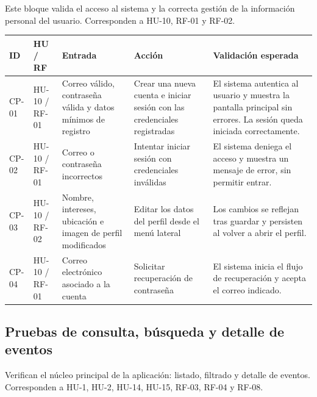 Este bloque valida el acceso al sistema y la correcta gestión de la información personal del usuario. Corresponden a HU-10, RF-01 y RF-02.

\begin{longtable}{|p{1.3cm}|p{1.6cm}|p{3cm}|p{3.8cm}|p{4.3cm}|}
\hline
\textbf{ID} & \textbf{HU / RF} & \textbf{Entrada} & \textbf{Acción} & \textbf{Validación esperada} \\
\hline
{}\label{cp:01}CP-01 & HU-10 / RF-01 & Correo válido, contraseña válida y datos mínimos de registro & Crear una nueva cuenta e iniciar sesión con las credenciales registradas & El sistema autentica al usuario y muestra la pantalla principal sin errores. La sesión queda iniciada correctamente. \\
\hline
{}\label{cp:02}CP-02 & HU-10 / RF-01 & Correo o contraseña incorrectos & Intentar iniciar sesión con credenciales inválidas & El sistema deniega el acceso y muestra un mensaje de error, sin permitir entrar. \\
\hline
{}\label{cp:03}CP-03 & HU-10 / RF-02 & Nombre, intereses, ubicación e imagen de perfil modificados & Editar los datos del perfil desde el menú lateral & Los cambios se reflejan tras guardar y persisten al volver a abrir el perfil. \\
\hline
{}\label{cp:04}CP-04 & HU-10 / RF-01 & Correo electrónico asociado a la cuenta & Solicitar recuperación de contraseña & El sistema inicia el flujo de recuperación y acepta el correo indicado. \\
\hline
\end{longtable}

\subsection{Pruebas de consulta, búsqueda y detalle de eventos}

Verifican el núcleo principal de la aplicación: listado, filtrado y detalle de eventos. Corresponden a HU-1, HU-2, HU-14, HU-15, RF-03, RF-04 y RF-08.


